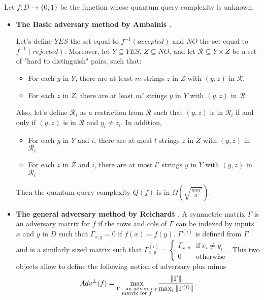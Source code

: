 Let $f:D\to\{0,1\}$ be the function whose quantum query complexity is unknown.
\begin{itemize}
    \item \textbf{The Basic adversary method by Ambainis \cite{andris_adversary_methode}}.
          \begin{theorem}
              \label{th:basicadv}
              Let's define $YES$ the set equal to $f^{-1}(accepted)$ and $NO$ the set
              equal to \\ $f^{-1}(rejected)$. Moreover, let $Y\subseteq YES$, $Z \subseteq NO$, and
              let $\mathcal{R} \subseteq Y\times Z$ be a set of "hard to distinguish" pairs, such that:
              \begin{itemize}
                  \item For each $y$ in $Y$, there are at least $m$ strings $z$ in $Z$ with $(y,z)$ in $\mathcal{R}$.
                  \item For each $z$ in $Z$, there are at least $m'$ strings $y$ in $Y$ with $(y,z)$ in $\mathcal{R}$.
              \end{itemize}
              Also, let's define $\mathcal{R}_i$ as a restriction from $\mathcal{R}$ such
              that $(y, z)$ is in $\mathcal{R}_i$ if and only if $(y, z)$ is in $\mathcal{R}$
              and $y_i \neq z_i$.
              In addition,
              \begin{itemize}
                  \item For each $y$ in $Y$ and $i$, there are at most $l$ strings $z$ in $Z$ with $(y,z)$ in $\mathcal{R}_i$
                  \item For each $z$ in $Z$ and $i$, there are at most $l'$ strings $y$ in $Y$ with $(y,z)$ in $\mathcal{R}_i$
              \end{itemize}
              Then the quantum query complexity $Q(f)$ is in  $\Omega(\sqrt{\frac{m m'}{ll'}})$.
          \end{theorem}
    \item \textbf{The general adversary method by Reichardt \cite{Reichardt_2009}}.
          A symmetric matrix $\Gamma$ is an adversary matrix for $f$ if the
          rows and cols of $\Gamma$ can be indexed by inputs $x$ and $y$ in $D$
          such that $\Gamma_{x,y} = 0$ if $f(x) = f(y)$. $\Gamma^{(i)}$ is
          defined from $\Gamma$ and is a similarly sized matrix such that
          $\Gamma^{(i)}_{x,y} = \left\{
              \begin{array}{ll}
                  \Gamma_{x,y} & \textrm{if} \ x_i\neq y_i \\
                  0            & \textrm{otherwise}
              \end{array}
              \right.$. This two objects allow to define the following notion of adversary plus minus
          \[Adv^{\pm}(f) = \underset{\textrm{\shortstack{$\Gamma$ -
                          an adversary\\[-1ex] matrix for $f$}}}{\max} \frac{\Vert \Gamma\Vert }{\max_i \Vert \Gamma^{(i)}\Vert}.
          \]


\end{itemize}
